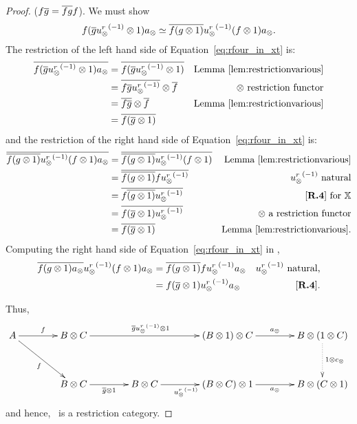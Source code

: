 \begin{proof}
      \rfour ($f \overline{g} = \overline{f g} f$). We must show
      \begin{equation}
        f (\overline{g} {u_{\otimes}^r}^{(-1)}\otimes 1) a_{\otimes} \overset{\scriptscriptstyle }{\simeq}
        \overline{f (g \otimes 1)} {u_{\otimes}^r}^{(-1)} (f\otimes 1) a_{\otimes}.
        \label{eq:rfour_in_xt}
      \end{equation}
      The restriction of the left hand side of Equation~\ref{eq:rfour_in_xt} is:
      \begin{align*}
        \overline{f (\overline{g} {u_{\otimes}^r}^{(-1)}\otimes 1) a_{\otimes}}
          & = \overline{f (\overline{g} {u_{\otimes}^r}^{(-1)}\otimes 1)} & \text{Lemma \ref{lem:restrictionvarious}} \\
        & = \overline{f \overline{g} {u_{\otimes}^r}^{(-1)}} \otimes \overline{f} & \otimes \text{ restriction functor}\\
        & = \overline{f \overline{g}} \otimes \overline{f} & \text{Lemma \ref{lem:restrictionvarious}} \\
        & = \overline{f (\overline{g} \otimes 1)}
      \end{align*}
      and the restriction of the right hand side of Equation~\ref{eq:rfour_in_xt}  is:
      \begin{align*}
        \rst{\rst{f (g \* 1)} \inv{\usr} (f\* 1) a_{\*}}
          & = \rst{\rst{f (g \* 1)} \inv{\usr} (f\* 1) } &  \text{Lemma \ref{lem:restrictionvarious}}\\
        & = \rst{\rst{f (g \* 1)} f \inv{\usr}  } & \inv{\usr} \text{ natural}\\
        & = \rst{f \rst{(g \* 1)}  \inv{\usr}  } & \text{ \rfour for }\X\\
        & = \rst{f (\rst{g} \* 1)  \inv{\usr}  } & \* \text{ a restriction functor}\\
        & = \rst{f (\rst{g} \* 1)    } & \text{Lemma \ref{lem:restrictionvarious}.}
      \end{align*}
      Computing the right hand side of Equation~\ref{eq:rfour_in_xt} in \X,
      \begin{align*}
        \overline{f(g\otimes 1)a_{\otimes}} {u_{\otimes}^r}^{(-1)} (f\otimes 1) a_{\otimes}
          & = \overline{f(g\otimes 1)} f {u_{\otimes}^r}^{(-1)} a_{\otimes} & {u_{\otimes}^r}^{(-1)}\text{ natural,}\\
        & = f (\overline{g} \otimes 1) {u_{\otimes}^r}^{(-1)} a_{\otimes} & [\text{\bfseries {R}.{4}}].
      \end{align*}

      Thus,
      \[
        \xymatrix @C=40pt @R=35pt{
          A \ar[r]^f \ar[dr]_{f}
            & B\* C \ar[rr]^{\restr{g} \inv{\usr}\* 1}
            &
            & (B\* 1) \* C \ar[r]^{a_{\*}}
            & B \* (1 \* C)\ar@{.>}[d]^{1\*c_{\*}}\\
          & B\*C \ar[r]_{\rst{g}\*1}
            & B \* C \ar[r]_{\inv{\usr}}
            & (B \* C) \* 1 \ar[r]_{a_{\*}}
            & B \* (C\*1)
        }
      \]
  and hence, \Xt\ is a restriction category.
\end{proof}
